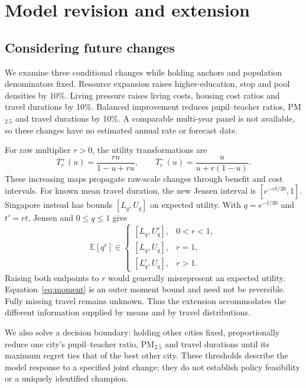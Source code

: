 \section{Model revision and extension}
\subsection{Considering future changes}
We examine three conditional changes while holding anchors and population
denominators fixed. Resource expansion raises higher-education, stop and pool
densities by 10\%. Living pressure raises living costs, housing cost ratios and
travel durations by 10\%. Balanced improvement reduces pupil--teacher ratios,
PM$_{2.5}$ and travel durations by 10\%. A comparable multi-year panel is not
available, so these changes have no estimated annual rate or forecast date.

For raw multiplier $r>0$, the utility transformations are
\begin{equation}
 T_r^{+}(u)=\frac{ru}{1-u+ru},\qquad
 T_r^{-}(u)=\frac{u}{u+r(1-u)}.
\end{equation}
These increasing maps propagate raw-scale changes through benefit and cost
intervals. For known mean travel duration, the new Jensen interval is
$[e^{-r\bar t/30},1]$. Singapore instead has bounds $[L_q,U_q]$ on expected
utility. With $q=e^{-t/30}$ and $t'=rt$, Jensen and $0\leq q\leq1$ give
\begin{equation}
 \mathbb E[q^r]\in
 \begin{cases}
 [L_q,U_q^r],&0<r<1,\\
 [L_q,U_q],&r=1,\\
 [L_q^r,U_q],&r>1.
 \end{cases}
 \label{eq:moment}
\end{equation}
Raising both endpoints to $r$ would generally misrepresent an expected utility.
Equation~\ref{eq:moment} is an outer moment bound and need not be reversible.
Fully missing travel remains unknown. Thus the extension accommodates the
different information supplied by means and by travel distributions.

\FutureDeterministic
We also solve a decision boundary: holding other cities fixed, proportionally
reduce one city's pupil--teacher ratio, PM$_{2.5}$ and travel durations until
its maximum regret ties that of the best other city. \FutureThresholds
These thresholds describe the model response to a specified joint change;
they do not establish policy feasibility or a uniquely identified champion.
\EvidenceThresholdCheck

